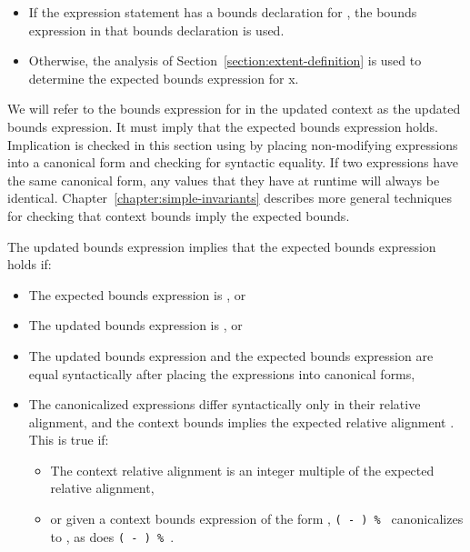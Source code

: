 \begin{itemize}
\item
  If the expression statement has a bounds declaration for , the
  bounds expression in that bounds declaration is used.
\item
  Otherwise, the analysis of Section~\ref{section:extent-definition}
  is used to determine the
  expected bounds expression for x.
\end{itemize}

We will refer to the bounds expression for  in the updated context
as the updated bounds expression.  It must imply that the
expected bounds expression holds. Implication is checked in this section
using by placing non-modifying expressions into a canonical form and
checking for syntactic equality. If two expressions have the same
canonical form, any values that they have at runtime will always be
identical. Chapter~\ref{chapter:simple-invariants}
describes more general techniques for checking
that context bounds imply the expected bounds.

The updated bounds expression implies that the expected bounds
expression holds if:

\begin{itemize}
\item
  The expected bounds expression is \boundsunknown, or
\item
  The updated bounds expression is \boundsany, or
\item
  The updated bounds expression and the expected bounds expression are
  equal syntactically after placing the expressions into canonical
  forms,
\item
  The canonicalized expressions
  differ syntactically only in their relative alignment, and
  the context bounds implies the expected relative alignment .
  This is true if:

  \begin{itemize}
  \item
    The context relative alignment is an integer multiple of the
    expected relative alignment,
  \item
   or given a context bounds expression of the form
   ,
   \texttt{( - ) \% }
   canonicalizes to , as does
   \texttt{( - ) \% }.
  \end{itemize}
\end{itemize}

